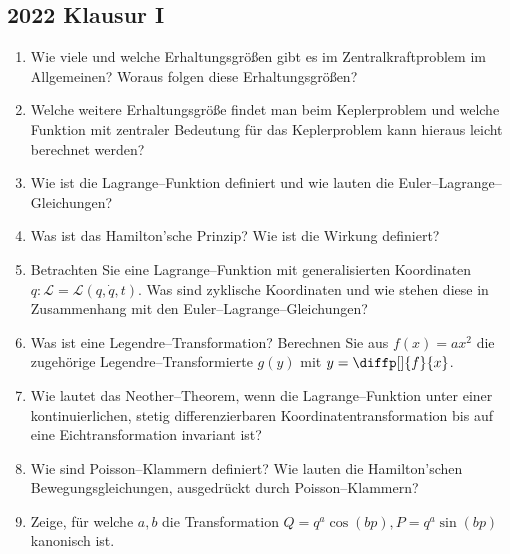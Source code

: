 \documentclass[a4paper,12pt]{article}
\numberwithin{equation}{section}
\begin{document}
\newpage
\subsection{2022 Klausur I}
\begin{enumerate}[label=\arabic*.]
        \item Wie viele und welche Erhaltungsgrößen gibt es im Zentralkraftproblem im Allgemeinen? Woraus folgen diese Erhaltungsgrößen?
        \item Welche weitere Erhaltungsgröße findet man beim Keplerproblem und welche Funktion mit zentraler Bedeutung für das Keplerproblem kann hieraus leicht berechnet werden?
        \item Wie ist die Lagrange--Funktion definiert und wie lauten die Euler--Lagrange--Gleichungen?
        \item Was ist das Hamilton'sche Prinzip? Wie ist die Wirkung definiert?
        \item Betrachten Sie eine Lagrange--Funktion mit generalisierten Koordinaten $q:\mathcal{L}=\mathcal{L}\left(q,\dot{q},t\right)$. Was sind zyklische Koordinaten und wie stehen diese in Zusammenhang mit den Euler--Lagrange--Gleichungen?
        \item Was ist eine Legendre--Transformation? Berechnen Sie aus $f\left(x\right)=ax^2$ die zugehörige Legendre--Transformierte $g\left(y\right)$ mit $y=\diffp[]{f}{x}$.
        \item Wie lautet das Neother--Theorem, wenn die Lagrange--Funktion unter einer kontinuierlichen, stetig differenzierbaren Koordinatentransformation bis auf eine Eichtransformation invariant ist?
        \item Wie sind Poisson--Klammern definiert? Wie lauten die Hamilton'schen Bewegungsgleichungen, ausgedrückt durch Poisson--Klammern?
        \item Zeige, für welche $a,b$ die Transformation $Q=q^a\cos \left(bp\right),P=q^a\sin \left(bp\right)$ kanonisch ist.
\end{enumerate}

\newpage
\end{document}

